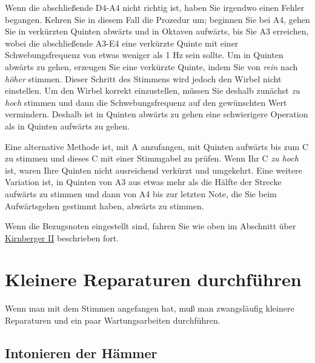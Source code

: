 Wenn die abschließende D4-A4 nicht richtig ist, haben Sie irgendwo einen Fehler begangen.
 Kehren Sie in diesem Fall die Prozedur um; beginnen Sie bei A4, gehen Sie in verkürzten Quinten abwärts und in Oktaven aufwärts, bis Sie A3 erreichen, wobei die abschließende A3-E4 eine verkürzte Quinte mit einer Schwebungsfrequenz von etwas weniger als 1 Hz sein sollte.
 Um in Quinten abwärts zu gehen, erzeugen Sie eine verkürzte Quinte, indem Sie von \textit{rein} nach \textit{höher} stimmen.
 Dieser Schritt des Stimmens wird jedoch den Wirbel nicht einstellen.
 Um den Wirbel korrekt einzustellen, müssen Sie deshalb zunächst \textit{zu hoch} stimmen und dann die Schwebungsfrequenz auf den gewünschten Wert vermindern.
 Deshalb ist in Quinten abwärts zu gehen eine schwierigere Operation als in Quinten aufwärts zu gehen.
 

Eine alternative Methode ist, mit A anzufangen, mit Quinten aufwärts bis zum C zu stimmen und dieses C mit einer Stimmgabel zu prüfen.
 Wenn Ihr C \textit{zu hoch} ist, waren Ihre Quinten nicht ausreichend verkürzt und umgekehrt.
 Eine weitere Variation ist, in Quinten von A3 aus etwas mehr als die Hälfte der Strecke aufwärts zu stimmen und dann von A4 bis zur letzten Note, die Sie beim Aufwärtsgehen gestimmt haben, abwärts zu stimmen.
 

Wenn die Bezugsnoten eingestellt sind, fahren Sie wie oben im Abschnitt über \hyperlink{c2_6_kirn2}{Kirnberger II} beschrieben fort.
 
\hypertarget{c2_7}{}

\section{Kleinere Reparaturen durchführen}

Wenn man mit dem Stimmen angefangen hat, muß man zwangsläufig kleinere Reparaturen und ein paar Wartungsarbeiten durchführen.
 \hypertarget{c2_7a}{}\hypertarget{c2_7_hamm}{}

\subsection{Intonieren der Hämmer}

